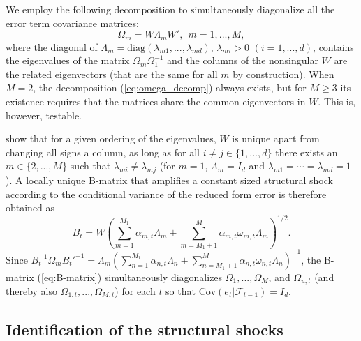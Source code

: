 \documentclass[nojss]{jss}
\begin{document}
We employ the following decomposition to simultaneously diagonalize all the error term covariance matrices:
\begin{equation}\label{eq:omega_decomp}
\Omega_m = W\Lambda_mW',  \ \ m=1,...,M,
\end{equation}
where the diagonal of $\Lambda_m = \text{diag}(\lambda_{m1},...,\lambda_{md})$,  $\lambda_{mi}>0$ $(i=1,...,d)$,  contains the eigenvalues of the matrix $\Omega_m\Omega_1^{-1}$ and the columns of the nonsingular $W$ are the related eigenvectors (that are the same for all $m$ by construction).  When $M=2$,  the decomposition (\ref{eq:omega_decomp}) always exists, but for $M\geq 3$ its existence requires that the matrices share the common eigenvectors in $W$.  This is, however, testable.

\citet[Proposition 1]{Lanne+Lutkepohl+Maciejowska:2010} show that for a given ordering of the eigenvalues, $W$ is unique apart from changing all signs a column, as long as for all $i\neq j\in \lbrace 1,...,d \rbrace$ there exists an $m\in\lbrace 2,...,M \rbrace$ such that $\lambda_{mi}\neq\lambda_{mj}$ (for $m=1$,  $\Lambda_m=I_d$ and $\lambda_{m1}=\cdots = \lambda_{md}=1$).  A locally unique B-matrix that amplifies a constant sized structural shock according to the conditional variance of the reduced form error is therefore obtained as
\begin{equation}\label{eq:B-matrix}
B_t = W(\sum_{m=1}^{M_1}\alpha_{m,t}\Lambda_m + \sum_{m=M_1 + 1}^{M}\alpha_{m,t}\omega_{m,t}\Lambda_m)^{1/2}.
\end{equation}
Since $B_t^{-1}\Omega_mB_t'^{-1}=\Lambda_m(\sum_{n=1}^{M_1}\alpha_{n,t}\Lambda_n + \sum_{n=M_1+1}^M\alpha_{n,t}\omega_{n,t}\Lambda_n)^{-1}$,  the B-matrix (\ref{eq:B-matrix}) simultaneously diagonalizes $\Omega_{1},...,\Omega_{M}$, and $\Omega_{u,t}$ (and thereby also $\Omega_{1,t},...,\Omega_{M,t}$) for each $t$ so that $\text{Cov}(e_t|\mathcal{F}_{t-1}) = I_d$.


\subsection{Identification of the structural shocks}
\end{document}
